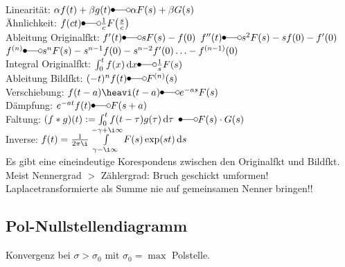 \documentclass[german]{latex4ei/latex4ei_sheet}
\renewcommand{\diff}{\mathop{}\!\mathrm{\vphantom( d}}
\renewcommand{\laplace}{\Laplace}
\begin{document}
\begin{sectionbox}
\begin{tabular}{rl|rl}
	\end{tabular}\\
	\everymath{\textstyle}
	Linearität: $\alpha f(t) + \beta g(t) \laplace \alpha F(s) + \beta G(s)$\\
	Ähnlichkeit: $f(ct) \laplace \frac{1}{c} F\bigl(  \frac{s}{c} \bigr)$\\
	Ableitung Originalfkt: $f'(t) \laplace s F(s) - f(0)$ \quad $f''(t) \laplace s^2 F(s) - sf(0) - f'(0)$\\
	$f^{(n)} \laplace s^n F(s) - s^{n-1} f(0) - s^{n-2} f'(0) \ldots - f^{(n-1)}(0)$\\
	Integral Originalfkt: $\int_0^t f(x) \diff x \laplace \frac{1}{s} F(s)$\\
	Ableitung Bildfkt: $(-t)^n f(t) \laplace F^{(n)} (s)$\\
	Verschiebung: $f(t-a)\heavi(t-a) \laplace e^{-as} F(s)$\\
	Dämpfung: $e^{-at} f(t) \laplace F(s+a)$\\
	Faltung: $(f * g)(t) := \int_0^t f( t - \tau) g(\tau) \diff \tau$ $\laplace F(s) \cdot G(s)$\\
	Inverse: $f(t) = \frac{1}{2\pi \i} \int\limits_{\gamma - \i \infty}^{-\gamma + \i \infty} F(s) \exp(st) \diff s$\\
	Es gibt eine eineindeutige Korespondens zwischen den Originalfkt und Bildfkt.
	Meist Nennergrad $>$ Zählergrad: Bruch geschickt umformen!
	Laplacetransformierte als Summe nie auf gemeinsamen Nenner bringen!!


	\subsection{Pol-Nullstellendiagramm}
	Konvergenz bei $\sigma > \sigma_0$ mit $\sigma_0 = \max$ Polstelle.\\
\end{sectionbox}

\end{document}
